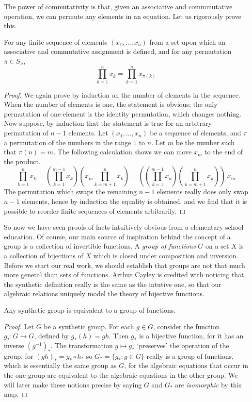 The power of commutativity is that, given an associative and commmutative operation, we can permute any elements in an equation. Let us rigorously prove this.

\begin{theorem}
    For any finite sequence of elements $(x_1, \dots, x_n)$ from a set upon which an associative and commutative assignment is defined, and for any permutation $\pi \in S_n$,
    \[ \prod_{k=1}^n x_k = \prod_{k=1}^n x_{\pi(k)} \]
\end{theorem}
\begin{proof}
    We again prove by induction on the number of elements in the sequence. When the number of elements is one, the statement is obvious; the only permutation of one element is the identity permutation, which changes nothing. Now suppose, by induction that the statement is true for an arbitrary permutation of $n-1$ elements. Let $(x_1, \dots, x_n)$ be a sequence of elements, and $\pi$ a permutation of the numbers in the range $1$ to $n$. Let $m$ be the number such that $\pi(n) = m$. The following calculation shows we can move $x_m$ to the end of the product.
    \[ \prod_{k=1}^n x_k = \left( \prod_{k=1}^{m-1} x_k \right) \left( x_m \prod_{k=m+1}^n x_k \right) = \left( \left( \prod_{k=1}^{m-1} x_k \right) \left( \prod_{k=m+1}^n x_k \right) \right)\ x_m \]
    The permutation which swaps the remaining $n-1$ elements really does only swap $n-1$ elements, hence by induction the equality is obtained, and we find that it is possible to reorder finite sequences of elements arbitrarily.
\end{proof}

So now we have seen proofs of facts intuitively obvious from a elementary school education. Of course, our main source of inspiration behind the concept of a group is a collection of invertible functions. A \emph{group of functions} $G$ on a set $X$ is a collection of bijections of $X$ which is closed under composition and inversion. Before we start our real work, we should establish that groups are not that much more general than sets of functions. Arthur Cayley is credited with noticing that the synthetic definition really is the same as the intutive one, so that our algebraic relations uniquely model the theory of bijective functions.

\begin{theorem}
    Any synthetic group is equivalent to a group of functions.
\end{theorem}
\begin{proof}
    Let $G$ be a synthetic group. For each $g \in G$, consider the function $g_*:G \to G$, defined by $g_*(h) = gh$. Then $g_*$ is a bijective function, for it has an inverse $(g^{-1})_*$. The transformation $g \mapsto g_*$ `preserves' the operation of the group, for $(gh)_* = g_* \circ h_*$ so $G_* = \{ g_* : g \in G \}$ really is a group of functions, which is essentially the same group as $G$, for the algebraic equations that occur in the one group are equivalent to the algebraic equations in the other group. We will later make these notions precise by saying $G$ and $G_*$ are {\it isomorphic} by this map.
\end{proof}

